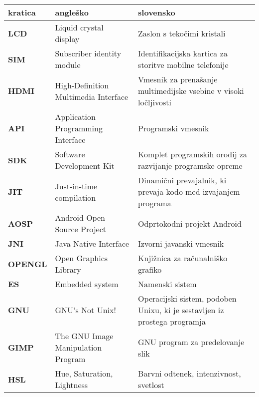 \begin{tabular}{l|p{5cm}|p{6cm}}
  {\bf kratica} & {\bf angleško} & {\bf slovensko} \\ \hline
  {\bf LCD} & Liquid crystal display & Zaslon s tekočimi kristali \\
  {\bf SIM} & Subscriber identity module & Identifikacijska kartica za storitve mobilne telefonije \\
  {\bf HDMI} & High-Definition Multimedia Interface & Vmesnik za prenašanje multimedijske vsebine v visoki ločljivosti \\
  {\bf API} & Application Programming Interface & Programski vmesnik \\
  {\bf SDK} & Software Development Kit & Komplet programskih orodij za razvijanje programske opreme \\
  {\bf JIT} & Just-in-time compilation & Dinamični prevajalnik, ki prevaja kodo med izvajanjem programa \\
  {\bf AOSP} & Android Open Source Project & Odprtokodni projekt Android \\
  {\bf JNI} & Java Native Interface & Izvorni javanski vmesnik \\
  {\bf OPENGL} & Open Graphics Library & Knjižnica za računalniško grafiko \\
  {\bf ES} & Embedded system & Namenski sistem \\
  {\bf GNU} & GNU's Not Unix! & Operacijski sistem, podoben Unixu, ki je sestavljen iz prostega programja \\
  {\bf GIMP} & The GNU Image Manipulation Program & GNU program za predelovanje slik \\
  {\bf HSL} & Hue, Saturation, Lightness & Barvni odtenek, intenzivnost, svetlost
\end{tabular}
